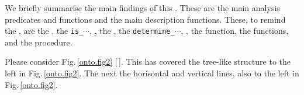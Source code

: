   
\label{sec:extq.Summary}\label{X:Summary}

\begynd
\pind We briefly summarise the main findings of this .
\pind These are the main 
\begynd
\pind analysis predicates and functions\ysfchg{, }
      and
\pind  the main description functions.
\afslut
\pind These, to remind the , are
\begynd
\pind {} the , the \texttt{is\_$\cdots$}, ,
\pind {}  the , the \texttt{determine\_$\cdots$},
      , 
\pind {}  the  function, 
\pind {}  the  functions, and
\pind {}  the  procedure.
\afslut
\afslut
\mnewfoil


\mnewfoil

\treprikker

\noindent
\begynd
\pind Please consider Fig.\,\ref{onto.fig2} [\,\pageref{onto.fig2}].
\begynd
\pind This  has covered the tree-like structure
      \nyl to the left in  Fig.\,\ref{onto.fig2}.
\pind The next  the horisontal and
      vertical lines, 
      \nyl also to the left in Fig.\,\ref{onto.fig2}.
\afslut
\afslut
\label{primer-extq.n}

